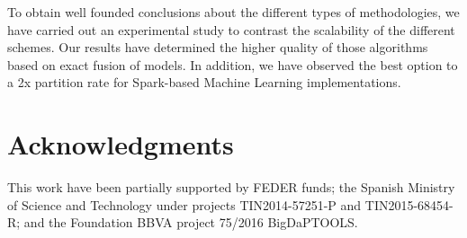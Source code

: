 \documentclass[3p,review]{elsarticle}
\begin{document}
	To obtain well founded conclusions about the different types of methodologies, we have carried out an experimental study to contrast the scalability of the different schemes. Our results have determined the higher quality of those algorithms based on exact fusion of models. In addition, we have observed the best option to a 2x partition rate for Spark-based Machine Learning implementations. 
	
	\section*{Acknowledgments}\label{sec:ack}
	
	This work have been partially supported by FEDER funds; the Spanish Ministry of Science and Technology under projects TIN2014-57251-P and TIN2015-68454-R; and the Foundation BBVA project 75/2016 BigDaPTOOLS.
	
	
	
	
	
\end{document}

